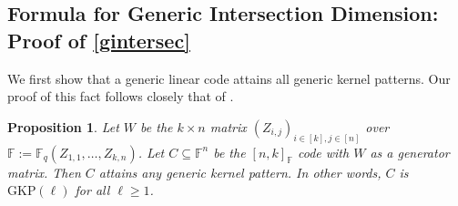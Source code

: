 \documentclass[11pt]{article}
\theoremstyle{plain}
\newtheorem{prop}[thm]{Proposition}
\theoremstyle{definition}
\theoremstyle{remark}
\newcommand{\F}{\mathbb{F}}
\begin{document}
\subsection{Formula for Generic Intersection Dimension: Proof of \cref{gintersec}}
We first show that a generic linear code attains all generic kernel patterns. Our proof of this fact follows closely that of \cite[Proposition 2.1]{brakensiek2023generic}. 

\begin{prop}\label{prop:GZP}
Let $W$ be the $k\times n$ matrix $(Z_{i,j})_{i\in [k], j\in [n]}$ over $\F:=\F_q(Z_{1,1},\dots,Z_{k,n})$.
Let $C\subseteq \F^n$ be the $[n,k]_\F$ code with $W$ as a generator matrix.
Then $C$ attains any generic kernel pattern. In other words, $C$ is $\mathrm{GKP}(\ell)$ for all $\ell\geq 1$. 
\end{prop} 
\end{document}
